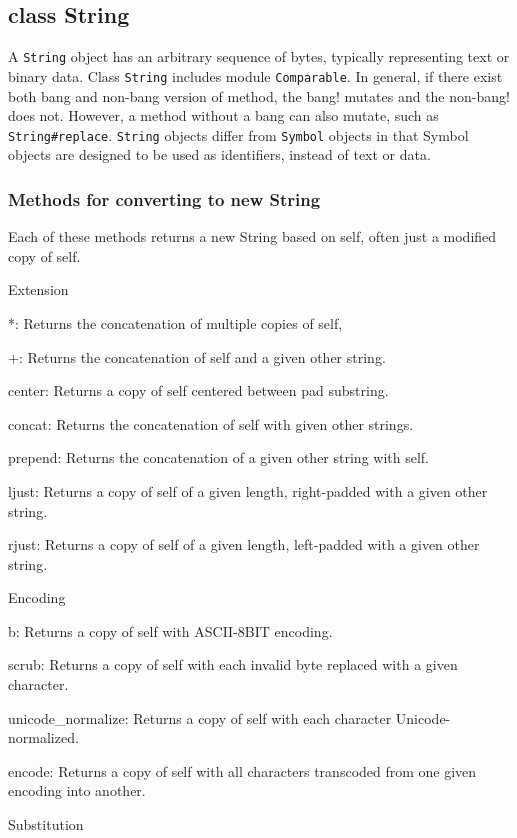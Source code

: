 \subsection{class String}
A \texttt{String} object has an arbitrary sequence of bytes, typically representing text or binary data.
Class \texttt{String} includes module \texttt{Comparable}.
In general, if there exist both bang and non-bang version of method, the bang! mutates and the non-bang! does not. However, a method without a bang can also mutate, such as \texttt{String#replace}.
\texttt{String} objects differ from \texttt{Symbol} objects in that Symbol objects are designed to be used as identifiers, instead of text or data.

\subsubsection{Methods for converting to new String}
Each of these methods returns a new String based on self, often just a modified copy of self.

Extension

*: Returns the concatenation of multiple copies of self,

+: Returns the concatenation of self and a given other string.

center: Returns a copy of self centered between pad substring.

concat: Returns the concatenation of self with given other strings.

prepend: Returns the concatenation of a given other string with self.

ljust: Returns a copy of self of a given length, right-padded with a given other string.

rjust: Returns a copy of self of a given length, left-padded with a given other string.

Encoding

b: Returns a copy of self with ASCII-8BIT encoding.

scrub: Returns a copy of self with each invalid byte replaced with a given character.

unicode\_normalize: Returns a copy of self with each character Unicode-normalized.

encode: Returns a copy of self with all characters transcoded from one given encoding into another.

Substitution

